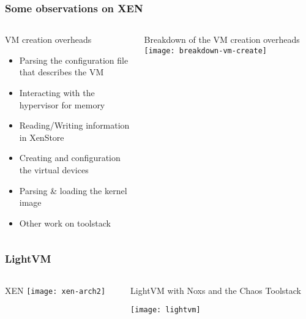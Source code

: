 \begin{frame}[plain]
	\frametitle{Some observations on XEN }
	
	
	
	\begin{columns}
		
		\begin{column}{.4\textwidth}
			 VM creation overheads
			\begin{itemize}			
				\item Parsing the configuration file that describes the VM
				\item  Interacting with the hypervisor for memory
				\item  Reading/Writing information in XenStore
				\item  Creating and configuration the virtual devices
				\item Parsing \& loading the kernel image 
				\item Other work on toolstack
				
			\end{itemize}
			
		\end{column}
		
		\begin{column}{.6\textwidth}
			
			\small Breakdown of the VM creation overheads 
			\texttt{[image: breakdown-vm-create]}
		\end{column}
		
		
	\end{columns}
	
	
\end{frame}



\begin{frame}[plain]
	\frametitle{LightVM }
	
	
	
	\begin{columns}
		
		\begin{column}{.5\textwidth}
			\centering XEN
			\texttt{[image: xen-arch2]}
			
		\end{column}
		
		\begin{column}{.5\textwidth}
			LightVM with Noxs and the Chaos
			Toolstack
			
			\centering
			\texttt{[image: lightvm]}

			
		\end{column}
		
		
	\end{columns}
	
	
\end{frame}


